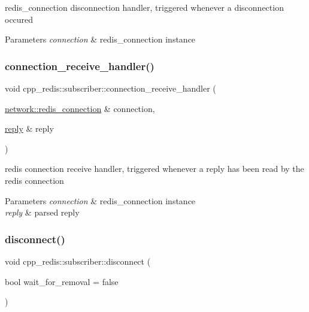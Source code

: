 redis\+\_\+connection disconnection handler, triggered whenever a disconnection occured


\begin{DoxyParams}{Parameters}
{\em connection} & redis\+\_\+connection instance \\
\hline
\end{DoxyParams}
\mbox{\label{classcpp__redis_1_1subscriber_ad37cdd903672a0daa395cc3624c50ecb}} 
\subsubsection{\texorpdfstring{connection\+\_\+receive\+\_\+handler()}{connection\_receive\_handler()}}
{\footnotesize\ttfamily void cpp\+\_\+redis\+::subscriber\+::connection\+\_\+receive\+\_\+handler (\begin{DoxyParamCaption}\item[{\hyperlink{classcpp__redis_1_1network_1_1redis__connection}{network\+::redis\+\_\+connection} \&}]{connection,  }\item[{\hyperlink{classcpp__redis_1_1reply}{reply} \&}]{reply }\end{DoxyParamCaption})\hspace{0.3cm}{\ttfamily [private]}}

redis connection receive handler, triggered whenever a reply has been read by the redis connection


\begin{DoxyParams}{Parameters}
{\em connection} & redis\+\_\+connection instance \\
\hline
{\em reply} & parsed reply \\
\hline
\end{DoxyParams}
\mbox{\label{classcpp__redis_1_1subscriber_aad1d0c3c6edb1522eb7b1bdb64b4705d}} 
\subsubsection{\texorpdfstring{disconnect()}{disconnect()}}
{\footnotesize\ttfamily void cpp\+\_\+redis\+::subscriber\+::disconnect (\begin{DoxyParamCaption}\item[{bool}]{wait\+\_\+for\+\_\+removal = {\ttfamily false} }\end{DoxyParamCaption})}

